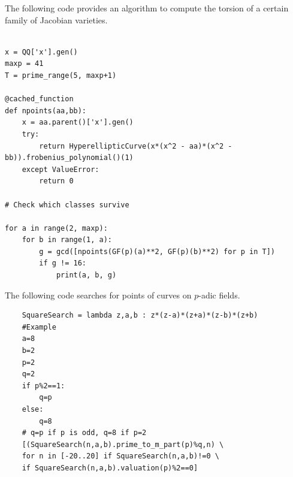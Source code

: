 The following code provides an algorithm to compute the torsion of a certain family of Jacobian varieties.
\begin{verbatim}

x = QQ['x'].gen()
maxp = 41
T = prime_range(5, maxp+1)

@cached_function
def npoints(aa,bb):
	x = aa.parent()['x'].gen()
	try:
		return HyperellipticCurve(x*(x^2 - aa)*(x^2 - bb)).frobenius_polynomial()(1)
	except ValueError:
		return 0

# Check which classes survive

for a in range(2, maxp):
	for b in range(1, a):
		g = gcd([npoints(GF(p)(a)**2, GF(p)(b)**2) for p in T])
		if g != 16:
			print(a, b, g)
\end{verbatim}
\vspace{20pt}
The following code searches for points of curves on $p$-adic fields.
\begin{verbatim}
	SquareSearch = lambda z,a,b : z*(z-a)*(z+a)*(z-b)*(z+b)
	#Example
	a=8
	b=2
	p=2
	q=2
	if p%2==1:
		q=p
	else:
		q=8
	# q=p if p is odd, q=8 if p=2
	[(SquareSearch(n,a,b).prime_to_m_part(p)%q,n) \
	for n in [-20..20] if SquareSearch(n,a,b)!=0 \
	if SquareSearch(n,a,b).valuation(p)%2==0]
\end{verbatim}